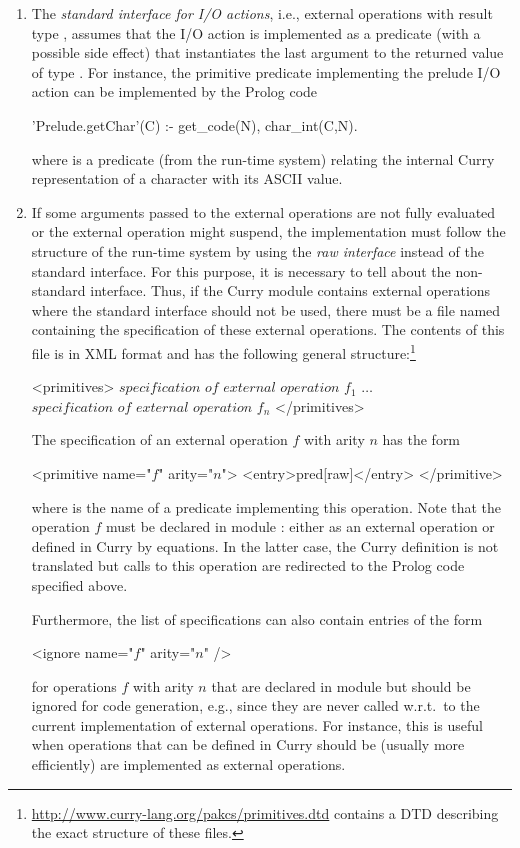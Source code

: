 \begin{enumerate}
\item
The \emph{standard interface for I/O actions}, i.e., external operations
with result type , assumes that the I/O action
is implemented as a predicate (with a possible side effect)
that instantiates the last argument to the returned value of type .
For instance, the primitive predicate 
implementing the prelude I/O action 
can be implemented by the Prolog code
\begin{curry}
'Prelude.getChar'(C) :- get_code(N), char_int(C,N).
\end{curry}
where  is a predicate (from the \CYS run-time system)
relating the internal Curry representation of a character
with its ASCII value.

\item
If some arguments passed to the external operations are not fully evaluated
or the external operation might suspend, the implementation must follow
the structure of the \CYS run-time system by using the \emph{raw interface}
instead of the standard interface.
For this purpose, it is necessary to tell \CYS about the
non-standard interface.
Thus, if the Curry module  contains external operations
where the standard interface should not be used,
there must be a file named  containing the
specification of these external operations. The contents of this file
is in XML format and has the following general structure:\footnote{%
\url{http://www.curry-lang.org/pakcs/primitives.dtd} contains a DTD
describing the exact structure of these files.}
\begin{curry}
<primitives>
  $\textit{specification of external operation~}f_1$
  $\ldots$
  $\textit{specification of external operation~}f_n$
</primitives>
\end{curry}
The specification of an external operation $f$
with arity $n$ has the form
\begin{curry}
<primitive name="$f$" arity="$n$">
  <entry>pred[raw]</entry>
</primitive>
\end{curry}
where  is the name of a predicate
implementing this operation. Note that the operation $f$ must be
declared in module : either as an external operation
or defined in Curry by equations. In the latter case,
the Curry definition is not translated but calls to this operation
are redirected to the Prolog code specified above.

Furthermore, the list of specifications can also contain entries of the form
\begin{curry}
<ignore name="$f$" arity="$n$" />
\end{curry}
for operations $f$ with arity $n$ that are declared in module 
but should be ignored for code generation, e.g., since they are
never called w.r.t.\ to the current implementation of external operations.
For instance, this is useful when operations that can
be defined in Curry should be (usually more efficiently) are implemented
as external operations.


\end{enumerate}
